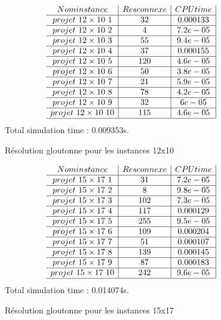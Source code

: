 \documentclass[12pt,a4paper]{article}
\begin{document}
\begin{figure}[H]
\centering

\[
\begin{array}{c|c|c|c}
Nom instance & Res connexe & CPU time \\ \hline
projet \ 12 \times 10 \ 1 &32 & 0.000133\\ \hline 
projet \ 12 \times 10 \ 2 &4 & 7.2e-05\\ \hline 
projet \ 12 \times 10 \ 3 &55 & 9.4e-05\\ \hline 
projet \ 12 \times 10 \ 4 &37 & 0.000155\\ \hline 
projet \ 12 \times 10 \ 5 &120 & 4.6e-05\\ \hline 
projet \ 12 \times 10 \ 6 &50 & 3.8e-05\\ \hline 
projet \ 12 \times 10 \ 7 &21 & 5.9e-05\\ \hline 
projet \ 12 \times 10 \ 8 &78 & 4.2e-05\\ \hline 
projet \ 12 \times 10 \ 9 &32 & 6e-05\\ \hline 
projet \ 12 \times 10 \ 10 &115 & 4.6e-05\\ \hline 
\end{array}\]
Total simulation time : 0.009353s.

\label{Res::Glouton 12x10}
\caption{Résolution gloutonne pour les instances 12x10}
\end{figure}

\begin{figure}[H]
\centering

\[
\begin{array}{c|c|c|c}
Nom instance & Res connexe & CPU time \\ \hline
projet \ 15 \times 17 \ 1 &31 & 7.2e-05\\ \hline 
projet \ 15 \times 17 \ 2 &8 & 9.8e-05\\ \hline 
projet \ 15 \times 17 \ 3 &102 & 7.3e-05\\ \hline 
projet \ 15 \times 17 \ 4 &117 & 0.000129\\ \hline 
projet \ 15 \times 17 \ 5 &255 & 9.5e-05\\ \hline 
projet \ 15 \times 17 \ 6 &109 & 0.000204\\ \hline 
projet \ 15 \times 17 \ 7 &51 & 0.000107\\ \hline 
projet \ 15 \times 17 \ 8 &139 & 0.000145\\ \hline 
projet \ 15 \times 17 \ 9 &87 & 0.000183\\ \hline 
projet \ 15 \times 17 \ 10 &242 & 9.6e-05\\ \hline 
\end{array}\]
Total simulation time : 0.014074s. 


\label{Glouton 15x17 }
\caption{Résolution gloutonne pour les instances 15x17}
\end{figure}
\end{document}
